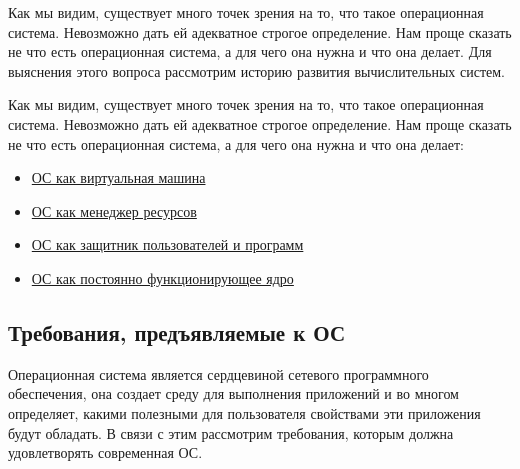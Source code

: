 Как мы видим, существует много точек зрения на то, что такое операционная система. Невозможно дать ей адекватное строгое определение. Нам проще сказать не что есть операционная система, а для чего она нужна и что она делает. Для выяснения этого вопроса рассмотрим историю развития вычислительных систем.
\newline

Как мы видим, существует много точек зрения на то, что такое операционная система. Невозможно дать ей адекватное строгое определение. Нам проще сказать не что есть операционная система, а для чего она нужна и что она делает:
\begin{itemize}
   \item {\hyperlink{opr1_OS}{ОС как виртуальная машина}}
   \item {\hyperlink{opr2_OS}{ОС как менеджер ресурсов}}
   \item {\hyperlink{opr3_OS}{ОС как защитник пользователей и программ}}
   \item {\hyperlink{opr4_OS}{ОС как постоянно функционирующее ядро}}
\end{itemize}
\newpage
\subsection{Требования, предъявляемые к ОС}
Операционная система является сердцевиной сетевого программного обеспечения, она создает среду для выполнения приложений и во многом определяет, какими полезными для пользователя свойствами эти приложения будут обладать. В связи с этим рассмотрим требования, которым должна удовлетворять современная ОС.

